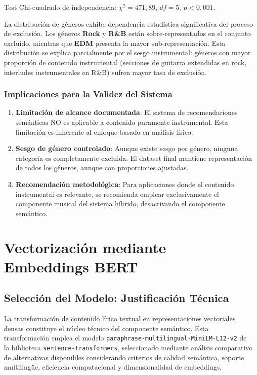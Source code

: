 Test Chi-cuadrado de independencia: $\chi^2 = 471{,}89$, $df = 5$, $p < 0{,}001$.

La distribución de géneros exhibe dependencia estadística significativa del proceso de exclusión. Los géneros \textbf{Rock} y \textbf{R\&B} están sobre-representados en el conjunto excluido, mientras que \textbf{EDM} presenta la mayor sub-representación. Esta distribución se explica parcialmente por el sesgo instrumental: géneros con mayor proporción de contenido instrumental (secciones de guitarra extendidas en rock, interludes instrumentales en R\&B) sufren mayor tasa de exclusión.

\subsubsection{Implicaciones para la Validez del Sistema}

\begin{enumerate}
    \item \textbf{Limitación de alcance documentada}: El sistema de recomendaciones semánticas NO es aplicable a contenido puramente instrumental. Esta limitación es inherente al enfoque basado en análisis lírico.

    \item \textbf{Sesgo de género controlado}: Aunque existe sesgo por género, ninguna categoría es completamente excluida. El dataset final mantiene representación de todos los géneros, aunque con proporciones ajustadas.

    \item \textbf{Recomendación metodológica}: Para aplicaciones donde el contenido instrumental es relevante, se recomienda emplear exclusivamente el componente musical del sistema híbrido, desactivando el componente semántico.
\end{enumerate}

\section{Vectorización mediante Embeddings BERT}
\label{sec:vectorizacion-bert}

\subsection{Selección del Modelo: Justificación Técnica}
\label{subsec:seleccion-modelo}

La transformación de contenido lírico textual en representaciones vectoriales densas constituye el núcleo técnico del componente semántico. Esta transformación emplea el modelo \texttt{paraphrase-multilingual-MiniLM-L12-v2} de la biblioteca \texttt{sentence-transformers}, seleccionado mediante análisis comparativo de alternativas disponibles considerando criterios de calidad semántica, soporte multilingüe, eficiencia computacional y dimensionalidad de embeddings.

